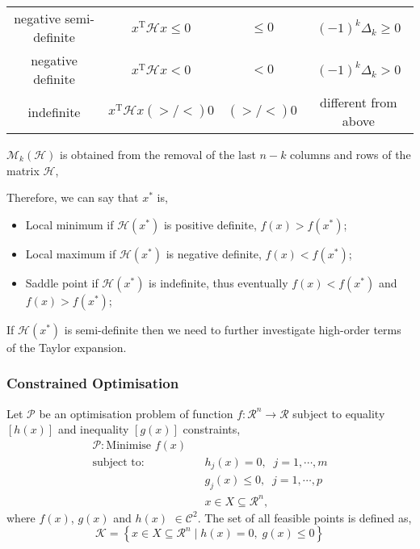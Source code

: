 \begin{enumerate}[(a)]
\begin{center}
\begin{tabular}{|c | c c c|}
             negative semi-definite & $x^{\text{T}}\mathcal{H}x \le 0$ & $\le 0$ &   $(-1)^{k}\Delta_{k}\ge 0$ \\
             negative definite      & $x^{\text{T}}\mathcal{H}x   < 0$ & $<   0$ &   $(-1)^{k}\Delta_{k} > 0$ \\
             indefinite             & $x^{\text{T}}\mathcal{H}x (>/<) 0$& $(>/<) 0$ &   different from above \\
          \hline
        \end{tabular}
    \end{center}
$\mathcal{M}_{k}\left(\mathcal{H}\right)$ is obtained from the removal of the last $n-k$ columns and rows of the matrix $\mathcal{H}$,
\end{enumerate}

Therefore,  we can say that $x^{\ast}$ is,
     \begin{itemize}
         \item Local minimum if $\mathcal{H}\left(x^{\ast}\right)$ is positive definite, $f(x) > f\left(x^{\ast}\right)$;
         \item Local maximum if $\mathcal{H}\left(x^{\ast}\right)$ is negative definite, $f(x) < f\left(x^{\ast}\right)$;
         \item Saddle point if $\mathcal{H}\left(x^{\ast}\right)$ is indefinite, thus eventually $f(x) < f\left(x^{\ast}\right)$ and $f(x) > f\left(x^{\ast}\right)$;
     \end{itemize}
     If $\mathcal{H}\left(x^{\ast}\right)$ is semi-definite then we need to further investigate high-order terms of the Taylor expansion.

\subsubsection{Constrained Optimisation}
Let $\mathcal{P}$ be an optimisation problem of function $f:\mathcal{R}^{n}\rightarrow\mathcal{R}$ subject to equality $\left[h(x)\right]$ and inequality $\left[g(x)\right]$ constraints,
    \begin{eqnarray}
        \mathcal{P}: \text{Minimise } f(x) && \nonumber \\
        \text{subject to}:&& h_{j}(x) = 0, \;\; j=1, \cdots, m \nonumber \\
                          && g_{j}(x) \le 0, \;\; j=1, \cdots, p \nonumber \\
                          && x\in X\subseteq \mathcal{R}^{n}, \nonumber 
    \end{eqnarray}
where $f(x)$, $g(x)$ and $h(x)$ $\in\mathcal{C}^{2}$. The set of all feasible points is defined as,
    \begin{displaymath}
        \mathcal{K} = \left\{x\in X\subseteq \mathcal{R}^{n}\; \left| \; h(x) = 0,\; g(x) \le 0\right. \right\}
    \end{displaymath}

